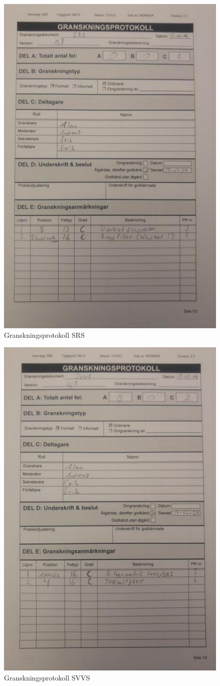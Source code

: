 \documentclass[paper=a4, fontsize=11pt,twoside]{article}
\begin{document}
\begin{figure}[h]
\centering
\includegraphics[width=0.65\linewidth]{SRS.jpg}
\caption{Granskningsprotokoll SRS}
\label{fig:20170322135735}
\end{figure}

\begin{figure}[h]
\centering
\includegraphics[width=0.65\linewidth]{SVVS.jpg}
\caption{Granskningsprotokoll SVVS}
\label{fig:20170322135723}
\end{figure}
\end{document}
